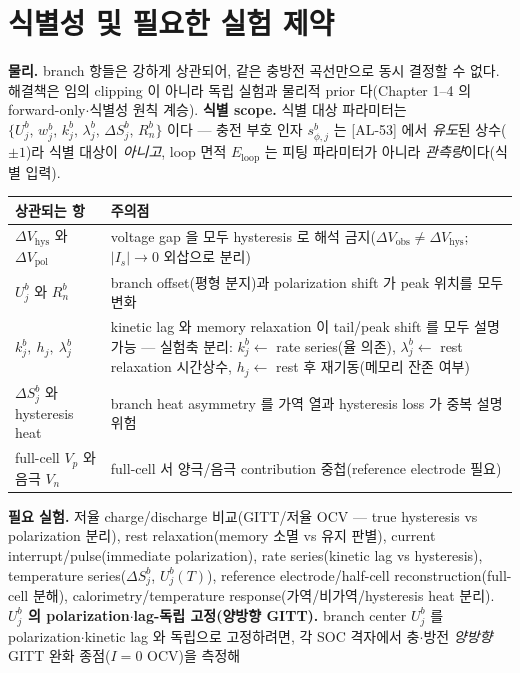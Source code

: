 \documentclass[11pt,a4paper]{article}
\newcommand{\hys}{\mathrm{hys}}
\newcommand{\pol}{\mathrm{pol}}
\newcommand{\obs}{\mathrm{obs}}
\newcommand{\AL}[1]{\textsf{[AL-#1]}}
\begin{document}
\section{식별성 및 필요한 실험 제약}\label{sec:ch5_ident}
\textbf{물리.} branch 항들은 강하게 상관되어, 같은 충방전 곡선만으로 동시 결정할 수 없다. 해결책은 임의
clipping 이 아니라 독립 실험과 물리적 prior 다(Chapter 1--4 의 forward-only$\cdot$식별성 원칙 계승).
\textbf{식별 scope.} 식별 대상 파라미터는 $\{U_j^b,\,w_j^b,\,k_j^b,\,\lambda_j^b,\,\Delta S_j^b,\,R_n^b\}$ 이다 —
충전 부호 인자 $s_{\phi,j}^b$ 는 \AL{53} 에서 \emph{유도}된 상수($\pm1$)라 식별 대상이 \emph{아니고}, loop 면적
$E_{\mathrm{loop}}$ 는 피팅 파라미터가 아니라 \emph{관측량}이다(식별 입력).
\begin{longtable}{p{} >{\raggedright\arraybackslash}p{}}
\toprule 상관되는 항 & 주의점 \\ \midrule \endhead
$\Delta V_\hys$ 와 $\Delta V_\pol$ & voltage gap 을 모두 hysteresis 로 해석 금지($\Delta V_\obs\ne\Delta V_\hys$; $|I_s|\to0$ 외삽으로 분리) \\
$U_j^b$ 와 $R_n^b$ & branch offset(평형 분지)과 polarization shift 가 peak 위치를 모두 변화 \\
$k_j^b,\ h_j,\ \lambda_j^b$ & kinetic lag 와 memory relaxation 이 tail/peak shift 를 모두 설명 가능 — 실험축 분리: $k_j^b\leftarrow$ rate series(율 의존), $\lambda_j^b\leftarrow$ rest relaxation 시간상수, $h_j\leftarrow$ rest 후 재기동(메모리 잔존 여부) \\
$\Delta S_j^b$ 와 hysteresis heat & branch heat asymmetry 를 가역 열과 hysteresis loss 가 중복 설명 위험 \\
full-cell $V_p$ 와 음극 $V_n$ & full-cell 서 양극/음극 contribution 중첩(reference electrode 필요) \\
\bottomrule
\end{longtable}
\textbf{필요 실험.} 저율 charge/discharge 비교(GITT/저율 OCV — true hysteresis vs polarization 분리), rest
relaxation(memory 소멸 vs 유지 판별), current interrupt/pulse(immediate polarization), rate series(kinetic
lag vs hysteresis), temperature series($\Delta S_j^b$, $U_j^b(T)$), reference electrode/half-cell
reconstruction(full-cell 분해), calorimetry/temperature response(가역/비가역/hysteresis heat 분리).
\textbf{$U_j^b$ 의 polarization$\cdot$lag-독립 고정(양방향 GITT).} branch center $U_j^b$ 를 polarization$\cdot$kinetic
lag 와 독립으로 고정하려면, 각 SOC 격자에서 충$\cdot$방전 \emph{양방향} GITT 완화 종점($I=0$ OCV)을 측정해
\end{document}
